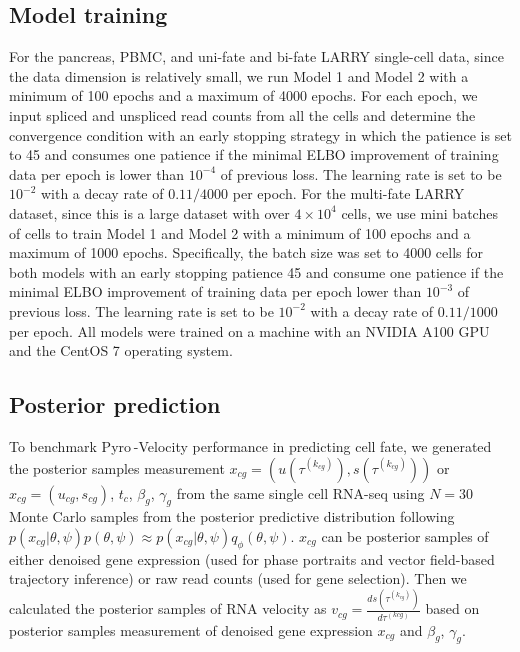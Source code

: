 \documentclass[
  sn-mathphys-num,
  lineno,
  twocolumn]{sn-jnl}
\begin{document}
\subsection{Model training}\label{sec-methods-training}

For the pancreas, PBMC, and uni-fate and bi-fate LARRY single-cell data,
since the data dimension is relatively small, we run Model 1 and Model 2
with a minimum of 100 epochs and a maximum of 4000 epochs. For each
epoch, we input spliced and unspliced read counts from all the cells and
determine the convergence condition with an early stopping strategy in
which the patience is set to 45 and consumes one patience if the minimal
ELBO improvement of training data per epoch is lower than \(10^{-4}\) of
previous loss. The learning rate is set to be \(10^{-2}\) with a decay
rate of \(0.11/4000\) per epoch. For the multi-fate LARRY dataset, since
this is a large dataset with over \(4 \times
10^4\) cells, we use mini batches of cells to train Model 1 and Model 2
with a minimum of 100 epochs and a maximum of 1000 epochs. Specifically,
the batch size was set to 4000 cells for both models with an early
stopping patience 45 and consume one patience if the minimal ELBO
improvement of training data per epoch lower than \(10^{-3}\) of
previous loss. The learning rate is set to be \(10^{-2}\) with a decay
rate of \(0.11/1000\) per epoch. All models were trained on a machine
with an NVIDIA A100 GPU and the CentOS 7 operating system.

\subsection{Posterior
prediction}\label{sec-methods-posterior-prediction}

To benchmark Pyro -Velocity performance in predicting cell fate, we
generated the posterior samples measurement
\(x_{cg}=\left(u\left(\tau^{(k_{cg})}\right),
s\left(\tau^{(k_{cg})}\right)\right)\) or
\(x_{cg}=\left(u_{cg}, s_{cg} \right)\), \(t_c\), \(\beta_g\),
\(\gamma_g\) from the same single cell RNA-seq using \(N=30\) Monte
Carlo samples from the posterior predictive distribution following
\(p(x_{cg} \vert \theta, \psi) p(\theta, \psi) \approx p(x_{cg} \vert \theta,
\psi) q_{\phi}(\theta, \psi)\). \(x_{cg}\) can be posterior samples of
either denoised gene expression (used for phase portraits and vector
field-based trajectory inference) or raw read counts (used for gene
selection). Then we calculated the posterior samples of RNA velocity as
\(v_{cg}=\frac{ds(\tau^{(k_{cg})})}{d \tau^{(k{cg})}}\) based on
posterior samples measurement of denoised gene expression \(x_{cg}\) and
\(\beta_{g}\), \(\gamma_{g}\).
\end{document}
